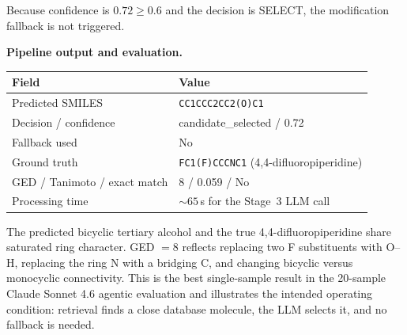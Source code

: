 \documentclass[conference]{IEEEtran}
\begin{document}
Because confidence is $0.72\geq0.6$ and the decision is SELECT, the modification fallback is not triggered.

\textbf{Pipeline output and evaluation.}

\begin{center}
\scriptsize
\begin{tabular}{ll}
\toprule
Field & Value\\
\midrule
Predicted SMILES & \texttt{CC1CCC2CC2(O)C1}\\
Decision / confidence & candidate\_selected / 0.72\\
Fallback used & No\\
Ground truth & \texttt{FC1(F)CCCNC1} (4,4-difluoropiperidine)\\
GED / Tanimoto / exact match & 8 / 0.059 / No\\
Processing time & $\sim65$\,s for the Stage~3 LLM call\\
\bottomrule
\end{tabular}
\end{center}

The predicted bicyclic tertiary alcohol and the true 4,4-difluoropiperidine share saturated ring character. GED $=8$ reflects replacing two F substituents with O--H, replacing the ring N with a bridging C, and changing bicyclic versus monocyclic connectivity. This is the best single-sample result in the 20-sample Claude Sonnet 4.6 agentic evaluation and illustrates the intended operating condition: retrieval finds a close database molecule, the LLM selects it, and no fallback is needed.
\end{document}
